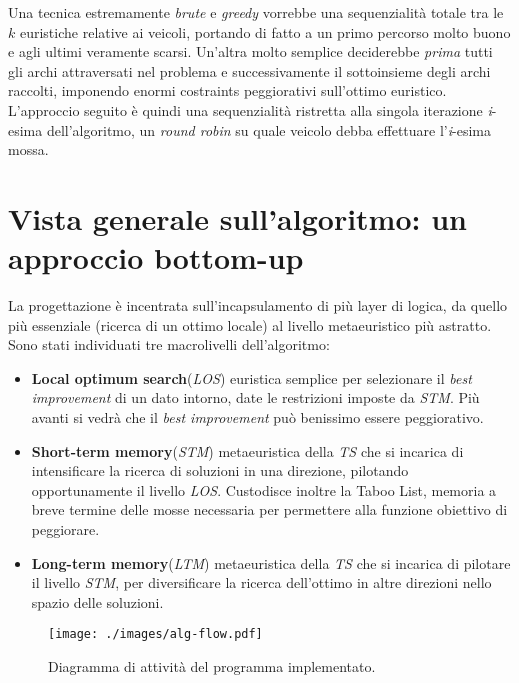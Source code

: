 	Una tecnica estremamente \emph{brute} e \emph{greedy} vorrebbe una sequenzialità totale tra le $k$ euristiche relative ai veicoli, portando
	di fatto a un primo percorso molto buono e agli ultimi veramente scarsi. Un'altra molto semplice deciderebbe \emph{prima} tutti gli archi
	attraversati nel problema e successivamente il sottoinsieme degli archi raccolti, imponendo enormi costraints peggiorativi sull'ottimo euristico.
	L'approccio seguito è quindi una sequenzialità ristretta alla singola iterazione \emph{i}-esima dell'algoritmo, un \emph{round robin} su quale
	veicolo debba effettuare l'\emph{i}-esima mossa.
\section{Vista generale sull'algoritmo: un approccio bottom-up}
	La progettazione è incentrata sull'incapsulamento di più layer di logica, da quello più essenziale (ricerca di un ottimo locale)
	al livello metaeuristico più astratto. Sono stati individuati tre macrolivelli dell'algoritmo:
	\begin{itemize}
	  \item \textbf{Local optimum search}(\emph{LOS}) euristica semplice per selezionare il \emph{best improvement}
	  di un dato intorno, date le restrizioni imposte da \emph{STM}. Più avanti si vedrà che il \emph{best improvement}
	  può benissimo essere peggiorativo.
	  \item \textbf{Short-term memory}(\emph{STM}) metaeuristica della \emph{TS} che si incarica di intensificare la ricerca di soluzioni 
	  in una direzione, pilotando opportunamente il livello \emph{LOS}. 
	  Custodisce inoltre la Taboo List, memoria a breve termine delle mosse necessaria per permettere alla funzione obiettivo di peggiorare. 
	  \item \textbf{Long-term memory}(\emph{LTM}) metaeuristica della \emph{TS} che si incarica di pilotare il livello \emph{STM}, 
	  per diversificare la ricerca dell'ottimo in altre direzioni nello spazio delle soluzioni.
	\end{itemize}
	\begin{figure}[H] 
	 	\begin{center}
	 	\texttt{[image: ./images/alg-flow.pdf]}
	 	\end{center}
	 	\caption{Diagramma di attività del programma implementato.}
	 	\label{fig:algFlow}
 	\end{figure}


